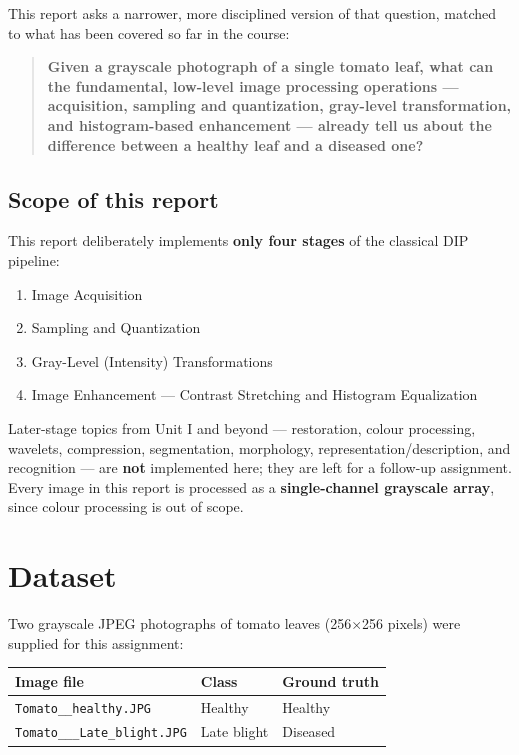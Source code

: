 \documentclass[11pt,a4paper]{article}
\begin{document}
This report asks a narrower, more disciplined version of that question, matched to what has been covered so far in the course:

\begin{quote}
\textbf{Given a grayscale photograph of a single tomato leaf, what can the fundamental, low-level image processing operations --- acquisition, sampling and quantization, gray-level transformation, and histogram-based enhancement --- already tell us about the difference between a healthy leaf and a diseased one?}
\end{quote}

\subsection{Scope of this report}

This report deliberately implements \textbf{only four stages} of the classical DIP pipeline:
\begin{enumerate}
    \item Image Acquisition
    \item Sampling and Quantization
    \item Gray-Level (Intensity) Transformations
    \item Image Enhancement --- Contrast Stretching and Histogram Equalization
\end{enumerate}

Later-stage topics from Unit I and beyond --- restoration, colour processing, wavelets, compression, segmentation, morphology, representation/description, and recognition --- are \textbf{not} implemented here; they are left for a follow-up assignment. Every image in this report is processed as a \textbf{single-channel grayscale array}, since colour processing is out of scope.

\section{Dataset}

Two grayscale JPEG photographs of tomato leaves (256$\times$256 pixels) were supplied for this assignment:

\begin{center}
\begin{tabular}{lll}
\toprule
Image file & Class & Ground truth \\
\midrule
\texttt{Tomato\_\_healthy.JPG} & Healthy & Healthy \\
\texttt{Tomato\_\_\_Late\_blight.JPG} & Late blight & Diseased \\
\bottomrule
\end{tabular}
\end{center}
\end{document}
